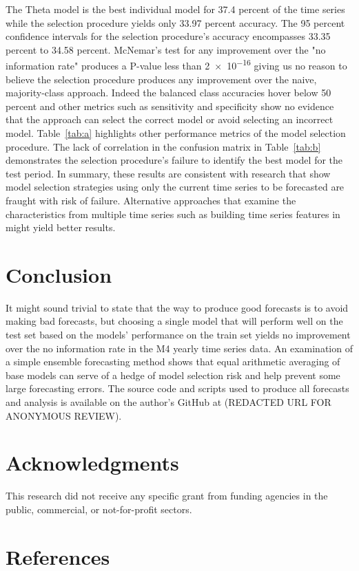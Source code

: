 \documentclass[11pt,3p,review,authoryear]{elsarticle}
\begin{document}
The Theta model is the best individual model for 37.4 percent of the time series while the selection procedure yields only 33.97 percent accuracy. The 95 percent confidence intervals for the selection procedure's accuracy encompasses 33.35 percent to 34.58 percent. McNemar's test for any improvement over the "no information rate" produces a P-value less than \num{2e-16} giving us no reason to believe the selection procedure produces any improvement over the naive, majority-class approach. Indeed the balanced class accuracies hover below 50 percent and other metrics such as sensitivity and specificity show no evidence that the approach can select the correct model or avoid selecting an incorrect model. Table~\ref{tab:a} highlights other performance metrics of the model selection procedure. The lack of correlation in the confusion matrix in Table~\ref{tab:b} demonstrates the selection procedure's failure to identify the best model for the test period. In summary, these results are consistent with research that show model selection strategies using only the current time series to be forecasted are fraught with risk of failure. Alternative approaches that examine the characteristics from multiple time series such as building time series features in \cite{modelSelection} might yield better results.


\section{Conclusion}
It might sound trivial to state that the way to produce good forecasts is to avoid making bad forecasts, but choosing a single model that will perform well on the test set based on the models' performance on the train set yields no improvement over the no information rate in the M4 yearly time series data. An examination of a simple ensemble forecasting method shows that equal arithmetic averaging of base models can serve of a hedge of model selection risk and help prevent some large forecasting errors. The source code and scripts used to produce all forecasts and analysis is available on the author's GitHub at (REDACTED URL FOR ANONYMOUS REVIEW).

\section*{Acknowledgments}

This research did not receive any specific grant from funding agencies in the public, commercial, or not-for-profit sectors.


\section{References}

\end{document}
